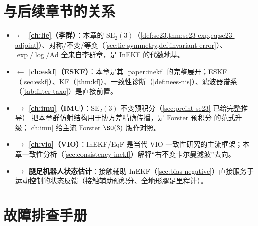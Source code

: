 \section*{与后续章节的关系}

\begin{itemize}
  \item \textbf{$\leftarrow$ \cref{ch:lie}（李群）}：本章的 $\mathrm{SE}_2(3)$（\cref{def:se23,thm:se23-exp,eq:se23-adjoint}）、对称/不变/等变（\cref{sec:lie-symmetry,def:invariant-error}）、$\exp/\log/\mathrm{Ad}$ 全来自李群章，是 InEKF 的代数地基。
  \item \textbf{$\leftarrow$ \cref{ch:eskf}（ESKF）}：本章是其 \cref{paper:inekf} 的完整展开；ESKF（\cref{sec:eskf}）、KF（\cref{thm:kf}）、一致性诊断（\cref{def:nees-nis}）、滤波器谱系（\cref{tab:filter-taxo}）是直接前置。
  \item \textbf{$\to$ \cref{ch:imu}（IMU）}：$\mathrm{SE}_2(3)$ 不变预积分（\cref{sec:preint-se23} 已给完整推导）\cite{brossard2021associating} 把本章群仿射结构用于协方差精确传播，是 Forster 预积分\cite{forster2017preintegration} 的范式升级；\cref{ch:imu} 给主流 Forster $\SO(3)$ 版作对照。
  \item \textbf{$\to$ \cref{ch:vio}（VIO）}：InEKF/EqF 是当代 VIO 一致性研究的主流框架；本章一致性分析（\cref{sec:consistency-inekf}）解释“右不变卡尔曼滤波”去向。
  \item \textbf{$\to$ 腿足机器人状态估计}：接触辅助 InEKF（\cref{sec:bias-negative}）直接服务于运动控制的状态反馈（接触辅助预积分\cite{hartley2018legged}、全地形腿足里程计\cite{wisth2023vilens}）。
\end{itemize}

\section*{故障排查手册}

